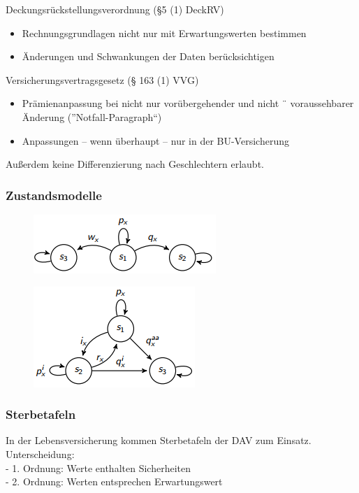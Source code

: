 \documentclass[12pt]{report}
\theoremstyle{dotless}
\theoremstyle{definition}
\begin{document}
Deckungsrückstellungsverordnung (§5 (1) DeckRV)
\begin{itemize}
\item Rechnungsgrundlagen nicht nur mit Erwartungswerten bestimmen
\item Änderungen und Schwankungen der Daten berücksichtigen
\end{itemize}

Versicherungsvertragsgesetz (§ 163 (1) VVG)
\begin{itemize}
\item Prämienanpassung bei nicht nur vorübergehender und nicht ¨
voraussehbarer Änderung  (”Notfall-Paragraph“)
\item Anpassungen – wenn überhaupt – nur in der BU-Versicherung
\end{itemize}

Außerdem keine Differenzierung nach Geschlechtern erlaubt.

\subsubsection{Zustandsmodelle}
\begin{figure}[ht]
	\centering
	\includegraphics[scale=1.2]{Bilder/Zustandsmodell_Leben1.png}
\end{figure}
\begin{figure}[ht]
	\centering
	\includegraphics[scale=1.2]{Bilder/Zustandsmodell_Leben2.png}
\end{figure}

\vspace{1cm}
\subsubsection{Sterbetafeln}
In der Lebensversicherung kommen Sterbetafeln der DAV zum Einsatz.\\
Unterscheidung: \\
- 1. Ordnung: Werte enthalten Sicherheiten\\
- 2. Ordnung: Werten entsprechen Erwartungswert
\end{document}
